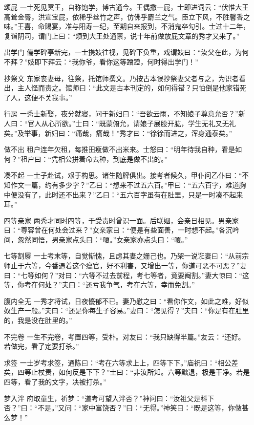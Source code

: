 \documentclass[12pt,UTF8]{ctexbook}
\begin{document}
颂屁
一士死见冥王，自称饱学，博古通今。王偶撒一屁，士即进词云：“伏惟大王高耸金臀，洪宣宝屁，依稀乎丝竹之声，仿佛乎麝兰之气。臣立下风，不胜馨香之味。”王喜，命赐宴，准与阳寿一纪，至期自来报到，不消鬼卒勾引。士过十二年，复诣阴司，谓门上曰：“烦到大王处通禀，说十年前做放屁文章的秀才又来了。”

出学门
儒学碑亭新完，一士携妓往视，见碑下负重，戏谓妓曰：“汝父在此，为何不拜？”妓即下拜云：“我你爷，看你这等蹭蹬，何时得出学门！”

抄祭文
东家丧妻母，往祭，托馆师撰文。乃按古本误抄祭妻父者与之，为识者看出，主人怪而责之。馆师曰：“此文是古本刊定的，如何得错？只怕倒是他家错死了人，这便不关我事。”

行房
一秀士新娶，夜分就寝，问于新妇曰：“吾欲云雨，不知娘子尊意允否？”新人曰：“官人从心所欲。”士曰：“既蒙俯允，请娘子展股开肱，学生无礼又无礼矣。”及举事，新妇曰：“痛哉，痛哉！”秀才曰：“徐徐而进之，浑身通泰矣。”

做不出
租户连年欠租，每推田瘦做不出米来。士怒曰：“明年待我自种，看是如何？”租户曰：“凭相公拼着命去种，到底是做不出的。”

凑不起
一士子赴试，艰于构思。诸生随牌俱出。接考者候久，甲仆问乙仆曰：“不知作文一篇，约有多少字？”乙曰：“想来不过五六百。”甲曰：“五六百字，难道胸中便没有了，此时还不出来？”乙曰：“五六百字虽有在肚里，只是一时凑不起来耳。”

四等亲家
两秀才同时四等，于受责时曾识一面。后联姻，会亲日相见。男亲家曰：“尊容曾在何处会过来？”女亲家曰：“便是有些面善，一时想不起。”各沉吟间，忽然同悟，男亲家点头曰：“嗄。”女亲家亦点头曰：“嗄。”

七等割屪
一士考末等，自觉惭愧，且虑其妻之姗己也。乃架一说诳妻曰：“从前宗师止于六等，今番遇着这个瘟官，好不利害，又增出一等，你道可恶不可恶？”妻曰：“七等如何？”对曰：“六等不过去前程，考七等者，竟要阉割。”妻大惊曰：“这等，你考在何处？”夫曰：“还亏我争气，考在六等，幸而免割。”

腹内全无
一秀才将试，日夜懮郁不已。妻乃慰之曰：“看你作文，如此之难，好似奴生产一般。”夫曰：“还是你每生子容易。”妻曰：“怎见得？”夫曰：“你是有在肚里的，我是没在肚里的。”

不完卷
一生不完卷，考置四等，受朴。对友曰：“我只缺得半篇。”友云：“还好。若做完，看了定要打杀。”

求签
一士岁考求签，通陈曰：“考在六等求上上，四等下下。”庙祝曰：“相公差矣，四等止杖责，如何反是下下？”士曰：“非汝所知。六等黜退，极是干净。若是四等，看了我的文字，决被打杀。”

梦入泮
府取童生，祈梦：“道考可望入泮否？”神问曰：“汝祖父是科下否？”曰：“不是。”又问：“家中富饶否？”曰：“无得。”神笑曰：“既是这等，你做甚么梦！”
\end{document}
